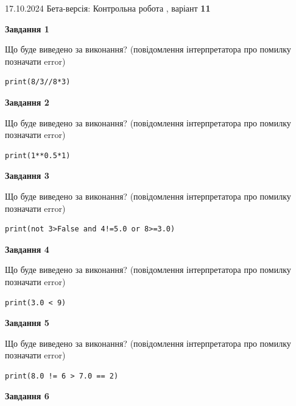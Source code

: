 \documentclass[12pt, ukrainian]{article}
\begin{document}
{\Large{17.10.2024 Бета-версія: Контрольна робота , варіант  \No \textbf { 11 }\par}}
{
\begin {large}
{\begin {center}\textbf{Завдання 1}\end {center}}

Що буде виведено за виконання? (повідомлення інтерпретатора про помилку позначати error)\par
\begin{verbatim}
print(8/3//8*3)
\end{verbatim}

{\begin {center}\textbf{Завдання 2}\end {center}}

Що буде виведено за виконання? (повідомлення інтерпретатора про помилку позначати error)\par
\begin{verbatim}
print(1**0.5*1)
\end{verbatim}

{\begin {center}\textbf{Завдання 3}\end {center}}

Що буде виведено за виконання? (повідомлення інтерпретатора про помилку позначати error)\par
\begin{verbatim}
print(not 3>False and 4!=5.0 or 8>=3.0)
\end{verbatim}

{\begin {center}\textbf{Завдання 4}\end {center}}

Що буде виведено за виконання? (повідомлення інтерпретатора про помилку позначати error)\par
\begin{verbatim}
print(3.0 < 9)
\end{verbatim}

{\begin {center}\textbf{Завдання 5}\end {center}}

Що буде виведено за виконання? (повідомлення інтерпретатора про помилку позначати error)\par
\begin{verbatim}
print(8.0 != 6 > 7.0 == 2)
\end{verbatim}

{\begin {center}\textbf{Завдання 6}\end {center}}


\end{large}}
\end{document}
